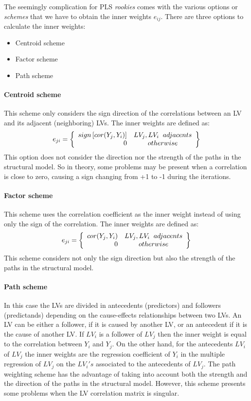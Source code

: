 \documentclass[12pt]{book}\usepackage{graphicx, color}
\begin{document}
The seemingly complication for PLS \textit{rookies} comes with the various options or \textit{schemes} that we have to obtain the inner weights  $e_{ij}$. There are three options to calculate the inner weights:
\begin{itemize}
 \item Centroid scheme
 \item Factor scheme
 \item Path scheme
\end{itemize}

\paragraph{Centroid scheme} This scheme only considers the sign direction of the correlations between an LV and its adjacent (neighboring) LVs. The inner weights are defined as:
$$ e_{ji} = \left\{ \begin{array}{rc}
  sign \left[ cor(Y_j, Y_i)\right] & LV_j, LV_i \hspace{2mm} adjacents \\
  0 & otherwise
  \end{array} \right\}
$$
This option does not consider the direction nor the strength of the paths in the structural model. So in theory, some problems may be present when a correlation is close to zero, causing a sign changing from +1 to -1 during the iterations.

\paragraph{Factor scheme} This scheme uses the correlation coefficient as the inner weight instead of using only the sign of the correlation. The inner weights are defined as:
$$ e_{ji} = \left\{ \begin{array}{rc}
  cor(Y_j, Y_i) & LV_j, LV_i \hspace{2mm} adjacents \\
  0 & otherwise
  \end{array} \right\}
$$
This scheme considers not only the sign direction but also the strength of the paths in the structural model.

\paragraph{Path scheme} In this case the LVs are divided in antecedents (predictors) and followers (predictands) depending on the cause-effects relationships between two LVs. An LV can be either a follower, if it is caused by another LV, or an antecedent if it is the cause of another LV. If $LV_i$ is a follower of $LV_j$ then the inner weight is equal to the correlation between $Y_i$ and $Y_j$. On the other hand, for the antecedents $LV_i$ of $LV_j$ the inner weights are the regression coefficient of $Y_i$ in the multiple regression of $LV_j$ on the $LV_i's$ associated to the antecedents of $LV_j$.
The path weighting scheme has the advantage of taking into account both the strength and the direction of the paths in the structural model. However, this scheme presents some problems when the LV correlation matrix is singular.
\end{document}
